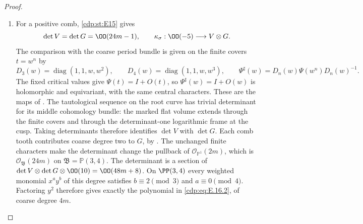 \begin{proof}
\begin{enumerate}[label=\arabic*.,leftmargin=*]
\item For a positive comb, \ref{cdp:st:E15} gives
\[
 \det V=\det G=\OO(24m-1),\qquad
 \kappa_\sigma:\OO(-5)\longrightarrow V\otimes G.
\]
The comparison with the coarse period bundle is given on the finite
covers $t=w^n$ by
\[
 D_3(w)=\operatorname{diag}(1,1,w,w^2),\qquad
 D_4(w)=\operatorname{diag}(1,1,w,w^3),\qquad
 \Psi^\sharp(w)=D_n(w)\Psi(w^n)D_n(w)^{-1}.
\]
The fixed critical values give $\Psi(t)=I+O(t)$, so
$\Psi^\sharp(w)=I+O(w)$ is holomorphic and equivariant, with the
same central characters. These are the maps of
\cite[Proposition~6.2, pp.~22--23]{Viaclovsky2026Combs}.
The tautological sequence on the root curve has trivial determinant
for its middle cohomology bundle: the marked flat volume extends
through the finite covers and through the determinant-one logarithmic
frame at the cusp. Taking determinants therefore identifies
$\det V$ with $\det G$. Each comb tooth contributes coarse degree
two to $G$, by \cite[equation~(5.5), p.~16]{Viaclovsky2026Combs}.
The unchanged finite characters make the determinant change the
pullback of $\mathcal O_{\mathbb P^1}(2m)$, which is
$\mathcal O_{\mathfrak B}(24m)$ on $\mathfrak B=\mathbb P(3,4)$.
The determinant is a section of $\det V\otimes\det G\otimes\OO(10)=\OO(48m+8)$. On $\PP(3,4)$ every weighted monomial $x^ay^b$ of this degree satisfies $b\equiv2\pmod3$ and $a\equiv0\pmod4$. Factoring $y^2$ therefore gives exactly the polynomial in \eqref{cdp:eq:E.16.2}, of coarse degree $4m$.


\end{enumerate}
\end{proof}
